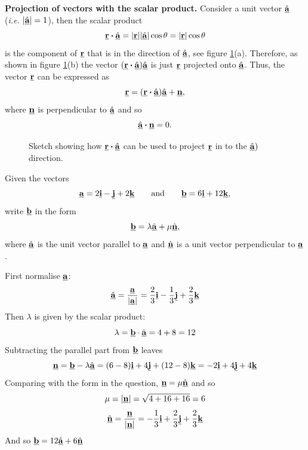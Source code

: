 \textbf{Projection of vectors with the scalar product.} Consider a unit vector $\hat{\underline{\mathbf{a}}}$ (\emph{i.e.} $\lvert\hat{\underline{\mathbf{a}}}\rvert=1$), then the scalar product
\[
\underline{\mathbf{r}}\boldsymbol{\cdot}\hat{\underline{\mathbf{a}}}
=\lvert\underline{\mathbf{r}}\rvert\lvert\hat{\underline{\mathbf{a}}}\rvert\cos\theta
=\lvert\underline{\mathbf{r}}\rvert\cos\theta
\]
is the component of $\underline{\mathbf{r}}$ that is in the direction of $\hat{\underline{\mathbf{a}}}$, see figure \ref{fig:projection}(a). Therefore, as shown in figure \ref{fig:projection}(b) the vector $(\underline{\mathbf{r}}\boldsymbol{\cdot}\hat{\underline{\mathbf{a}}})\hat{\underline{\mathbf{a}}}$ is just $\underline{\mathbf{r}}$ projected onto $\hat{\underline{\mathbf{a}}}$. Thus, the vector $\underline{\mathbf{r}}$ can be expressed as
\[
\underline{\mathbf{r}}
=(\underline{\mathbf{r}}\boldsymbol{\cdot}\hat{\underline{\mathbf{a}}})\hat{\underline{\mathbf{a}}}+\underline{\mathbf{n}},
\]
where $\underline{\mathbf{n}}$ is perpendicular to $\hat{\underline{\mathbf{a}}}$ and so
\[
\hat{\underline{\mathbf{a}}}\boldsymbol{\cdot}\underline{\mathbf{n}}=0.
\]
\begin{figure}[ht]
    \centering
    \hspace{20mm}
    \caption{Sketch showing how $\underline{\mathbf{r}}\boldsymbol{\cdot}\hat{\underline{\mathbf{a}}}$ can be used to project $\underline{\mathbf{r}}$ in to the $\hat{\underline{\mathbf{a}}})$ direction.}
    \label{fig:projection}
\end{figure}

\begin{example}[Video]
Given the vectors
\[
\underline{\mathbf{a}}=2\underline{\mathbf{i}}-\underline{\mathbf{j}}+2\underline{\mathbf{k}}
\qquad\text{and}\qquad
\underline{\mathbf{b}}=6\underline{\mathbf{i}}+12\underline{\mathbf{k}},
\]
write $\underline{\mathbf{b}}$ in the form
\[
\underline{\mathbf{b}}=\lambda\hat{\underline{\mathbf{a}}}+\mu\hat{\underline{\mathbf{n}}},
\]
where $\hat{\underline{\mathbf{a}}}$ is the unit vector parallel to $\underline{\mathbf{a}}$ and $\hat{\underline{\mathbf{n}}}$ is a unit vector perpendicular to $\underline{\mathbf{a}}$.
\end{example}

\begin{solution}
First normalise $\underline{\mathbf{a}}$:
\[
\hat{\underline{\mathbf{a}}}=\frac{\underline{\mathbf{a}}}{|\underline{\mathbf{a}}|}
=\frac{2}{3}\underline{\mathbf{i}}-\frac{1}{3}\underline{\mathbf{j}}+\frac{2}{3}\underline{\mathbf{k}}
\]
Then $\lambda$ is given by the scalar product:
\[
\lambda=\underline{\mathbf{b}}\cdot\hat{\underline{\mathbf{a}}}=4+8=12
\]
Subtracting the parallel part from $\underline{\mathbf{b}}$ leaves
\[
\underline{\mathbf{n}}=\underline{\mathbf{b}}-\lambda\hat{\underline{\mathbf{a}}}
=(6-8)\underline{\mathbf{i}}+4\underline{\mathbf{j}}+(12-8)\underline{\mathbf{k}}=-2\underline{\mathbf{i}}+4\underline{\mathbf{j}}+4\underline{\mathbf{k}}
\]
Comparing with the form in the question, $\underline{\mathbf{n}}=\mu\hat{\underline{\mathbf{n}}}$ and so
\[
\mu=|\underline{\mathbf{n}}|=\sqrt{4+16+16}=6
\]
\[
\hat{\underline{\mathbf{n}}}=\frac{\underline{\mathbf{n}}}{|\underline{\mathbf{n}}|}
=-\frac{1}{3}\underline{\mathbf{i}}+\frac{2}{3}\underline{\mathbf{j}}+\frac{2}{3}\underline{\mathbf{k}}
\]
And so $\underline{\mathbf{b}}=12\hat{\underline{\mathbf{a}}}+6\hat{\underline{\mathbf{n}}}$
\end{solution}

